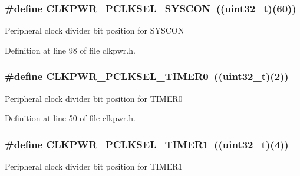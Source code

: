 \subsubsection[{\texorpdfstring{C\+L\+K\+P\+W\+R\+\_\+\+P\+C\+L\+K\+S\+E\+L\+\_\+\+S\+Y\+S\+C\+ON}{CLKPWR_PCLKSEL_SYSCON}}]{\setlength{\rightskip}{0pt plus 5cm}\#define C\+L\+K\+P\+W\+R\+\_\+\+P\+C\+L\+K\+S\+E\+L\+\_\+\+S\+Y\+S\+C\+ON~(({\bf uint32\+\_\+t})(60))}\hypertarget{group___c_l_k_p_w_r___public___macros_ga5e87768ef5afcdeb8e4c2a9085fa381e}{}\label{group___c_l_k_p_w_r___public___macros_ga5e87768ef5afcdeb8e4c2a9085fa381e}
Peripheral clock divider bit position for S\+Y\+S\+C\+ON 

Definition at line 98 of file clkpwr.\+h.

\subsubsection[{\texorpdfstring{C\+L\+K\+P\+W\+R\+\_\+\+P\+C\+L\+K\+S\+E\+L\+\_\+\+T\+I\+M\+E\+R0}{CLKPWR_PCLKSEL_TIMER0}}]{\setlength{\rightskip}{0pt plus 5cm}\#define C\+L\+K\+P\+W\+R\+\_\+\+P\+C\+L\+K\+S\+E\+L\+\_\+\+T\+I\+M\+E\+R0~(({\bf uint32\+\_\+t})(2))}\hypertarget{group___c_l_k_p_w_r___public___macros_gab1acc813f04ade492704686390180d0e}{}\label{group___c_l_k_p_w_r___public___macros_gab1acc813f04ade492704686390180d0e}
Peripheral clock divider bit position for T\+I\+M\+E\+R0 

Definition at line 50 of file clkpwr.\+h.

\subsubsection[{\texorpdfstring{C\+L\+K\+P\+W\+R\+\_\+\+P\+C\+L\+K\+S\+E\+L\+\_\+\+T\+I\+M\+E\+R1}{CLKPWR_PCLKSEL_TIMER1}}]{\setlength{\rightskip}{0pt plus 5cm}\#define C\+L\+K\+P\+W\+R\+\_\+\+P\+C\+L\+K\+S\+E\+L\+\_\+\+T\+I\+M\+E\+R1~(({\bf uint32\+\_\+t})(4))}\hypertarget{group___c_l_k_p_w_r___public___macros_ga6f40e91e37d638a7005abc64f0f339f7}{}\label{group___c_l_k_p_w_r___public___macros_ga6f40e91e37d638a7005abc64f0f339f7}
Peripheral clock divider bit position for T\+I\+M\+E\+R1 

